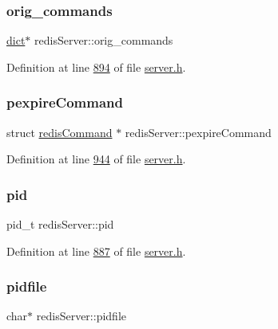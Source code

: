 \subsubsection{\texorpdfstring{orig\+\_\+commands}{orig\_commands}}
{\footnotesize\ttfamily \hyperlink{structdict}{dict}$\ast$ redis\+Server\+::orig\+\_\+commands}



Definition at line \hyperlink{server_8h_source_l00894}{894} of file \hyperlink{server_8h_source}{server.\+h}.

\mbox{\label{structredisServer_af20eaaa85f3f389db6607daf6854b923}} 
\subsubsection{\texorpdfstring{pexpire\+Command}{pexpireCommand}}
{\footnotesize\ttfamily struct \hyperlink{structredisCommand}{redis\+Command} $\ast$ redis\+Server\+::pexpire\+Command}



Definition at line \hyperlink{server_8h_source_l00944}{944} of file \hyperlink{server_8h_source}{server.\+h}.

\mbox{\label{structredisServer_a8af975350b4c93e60397e503672c91a3}} 
\subsubsection{\texorpdfstring{pid}{pid}}
{\footnotesize\ttfamily pid\+\_\+t redis\+Server\+::pid}



Definition at line \hyperlink{server_8h_source_l00887}{887} of file \hyperlink{server_8h_source}{server.\+h}.

\mbox{\label{structredisServer_a7a48bc2ea3955b60e80129ac9d0f8e4d}} 
\subsubsection{\texorpdfstring{pidfile}{pidfile}}
{\footnotesize\ttfamily char$\ast$ redis\+Server\+::pidfile}



